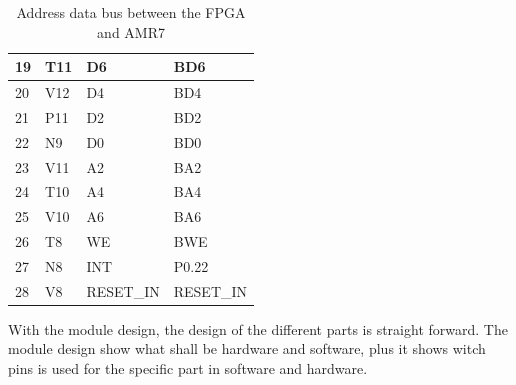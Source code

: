 \begin{table}[H]
\begin{tabular}{|p{3cm}|p{3cm}|p{3cm}|p{3cm}|}
        19          & T11          & D6               & BD6               \\ \hline
        20          & V12          & D4               & BD4               \\ \hline
        21          & P11          & D2               & BD2               \\ \hline
        22          & N9           & D0               & BD0               \\ \hline
        23          & V11          & A2               & BA2               \\ \hline
        24          & T10          & A4               & BA4               \\ \hline
        25          & V10          & A6               & BA6               \\ \hline
        26          & T8           & WE               & BWE               \\ \hline
        27          & N8           & INT              & P0.22             \\ \hline
        28          & V8           & RESET\_IN        & RESET\_IN         \\
        \hline
    \end{tabular}
    \caption{Address data bus between the FPGA and AMR7}
\end{table}

With the module design, the design of the different parts is straight forward. The module design show what shall be hardware and software, plus it shows witch pins is used for the specific part in software and hardware.